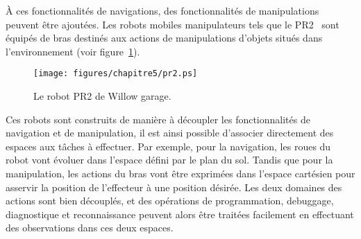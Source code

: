 À ces fonctionnalités de navigations, des fonctionnalités
de manipulations peuvent être ajoutées.
Les robots mobiles manipulateurs tels 
que le PR2~\cite{PR2} sont équipés de bras 
destinés aux actions de manipulations d'objets situés dans l'environnement
(voir figure~\ref{fig:pr2}).
\begin{figure}[t]
  \begin{center}
    \texttt{[image: figures/chapitre5/pr2.ps]}
  \end{center}
  \caption{Le robot PR2 de Willow garage.}
  \label{fig:pr2}
\end{figure}
Ces robots sont construits de manière à découpler les fonctionnalités de navigation
et de manipulation, il est ainsi
possible d'associer directement des espaces aux t\^aches à effectuer.
Par exemple, pour la navigation, les roues du robot vont évoluer dans l'espace défini par le plan
du sol. Tandis que pour la manipulation, les actions du bras vont être exprimées
dans l'espace cartésien pour asservir la position de l'effecteur à une position désirée.
Les deux domaines des actions sont bien découplés, et des opérations de 
programmation, debuggage, diagnostique et reconnaissance peuvent alors être traitées facilement en effectuant
des observations dans ces deux espaces.


